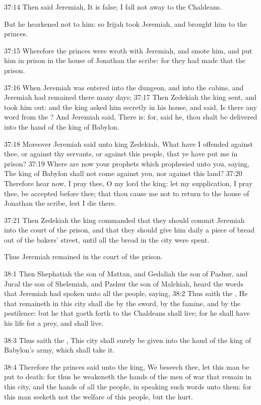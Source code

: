 37:14 Then said Jeremiah, It is false; I fall not away to the
Chaldeans.

But he hearkened not to him: so Irijah took Jeremiah, and brought him
to the princes.

37:15 Wherefore the princes were wroth with Jeremiah, and smote him,
and put him in prison in the house of Jonathan the scribe: for they
had made that the prison.

37:16 When Jeremiah was entered into the dungeon, and into the cabins,
and Jeremiah had remained there many days; 37:17 Then Zedekiah the
king sent, and took him out: and the king asked him secretly in his
house, and said, Is there any word from the \LORD? And Jeremiah said,
There is: for, said he, thou shalt be delivered into the hand of the
king of Babylon.

37:18 Moreover Jeremiah said unto king Zedekiah, What have I offended
against thee, or against thy servants, or against this people, that ye
have put me in prison?  37:19 Where are now your prophets which
prophesied unto you, saying, The king of Babylon shall not come
against you, nor against this land?  37:20 Therefore hear now, I pray
thee, O my lord the king: let my supplication, I pray thee, be
accepted before thee; that thou cause me not to return to the house of
Jonathan the scribe, lest I die there.

37:21 Then Zedekiah the king commanded that they should commit
Jeremiah into the court of the prison, and that they should give him
daily a piece of bread out of the bakers' street, until all the bread
in the city were spent.

Thus Jeremiah remained in the court of the prison.

38:1 Then Shephatiah the son of Mattan, and Gedaliah the son of
Pashur, and Jucal the son of Shelemiah, and Pashur the son of
Malchiah, heard the words that Jeremiah had spoken unto all the
people, saying, 38:2 Thus saith the \LORD, He that remaineth in this
city shall die by the sword, by the famine, and by the pestilence: but
he that goeth forth to the Chaldeans shall live; for he shall have his
life for a prey, and shall live.

38:3 Thus saith the \LORD, This city shall surely be given into the
hand of the king of Babylon's army, which shall take it.

38:4 Therefore the princes said unto the king, We beseech thee, let
this man be put to death: for thus he weakeneth the hands of the men
of war that remain in this city, and the hands of all the people, in
speaking such words unto them: for this man seeketh not the welfare of
this people, but the hurt.

